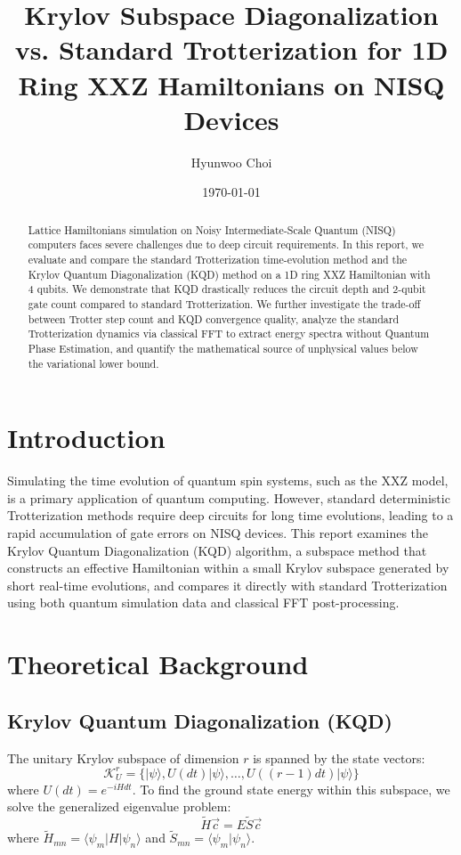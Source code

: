 \documentclass[11pt,a4paper]{article}
\title{\textbf{Krylov Subspace Diagonalization vs. Standard Trotterization for 1D Ring XXZ Hamiltonians on NISQ Devices}}
\author{Hyunwoo Choi}
\date{\today}
\begin{document}
\maketitle

\begin{abstract}
Lattice Hamiltonians simulation on Noisy Intermediate-Scale Quantum (NISQ) computers faces severe challenges due to deep circuit requirements. In this report, we evaluate and compare the standard Trotterization time-evolution method and the Krylov Quantum Diagonalization (KQD) method on a 1D ring XXZ Hamiltonian with 4 qubits. We demonstrate that KQD drastically reduces the circuit depth and 2-qubit gate count compared to standard Trotterization. We further investigate the trade-off between Trotter step count and KQD convergence quality, analyze the standard Trotterization dynamics via classical FFT to extract energy spectra without Quantum Phase Estimation, and quantify the mathematical source of unphysical values below the variational lower bound.
\end{abstract}

\section{Introduction}
Simulating the time evolution of quantum spin systems, such as the XXZ model, is a primary application of quantum computing. However, standard deterministic Trotterization methods require deep circuits for long time evolutions, leading to a rapid accumulation of gate errors on NISQ devices. This report examines the Krylov Quantum Diagonalization (KQD) algorithm, a subspace method that constructs an effective Hamiltonian within a small Krylov subspace generated by short real-time evolutions, and compares it directly with standard Trotterization using both quantum simulation data and classical FFT post-processing.

\section{Theoretical Background}
\subsection{Krylov Quantum Diagonalization (KQD)}
The unitary Krylov subspace of dimension $r$ is spanned by the state vectors:
\begin{equation}
\mathcal{K}_U^r = \{ |\psi\rangle, U(dt)|\psi\rangle, \dots, U((r-1)dt)|\psi\rangle \}
\end{equation}
where $U(dt) = e^{-i H dt}$. To find the ground state energy within this subspace, we solve the generalized eigenvalue problem:
\begin{equation}
\tilde{H} \vec{c} = E \tilde{S} \vec{c}
\end{equation}
where $\tilde{H}_{mn} = \langle \psi_m | H | \psi_n \rangle$ and $\tilde{S}_{mn} = \langle \psi_m | \psi_n \rangle$.
\end{document}
